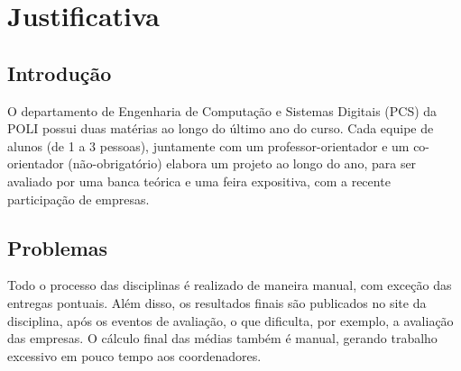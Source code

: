 \chapter{Justificativa}

\section{Introdução}
O departamento de Engenharia de Computação e Sistemas Digitais (PCS) da POLI possui duas matérias ao longo do último ano do curso. Cada equipe de alunos (de 1 a 3 pessoas), juntamente com um professor-orientador e um co-orientador (não-obrigatório) elabora um projeto ao longo do ano, para ser avaliado por uma banca teórica e uma feira expositiva, com a recente participação de empresas.

\section{Problemas}
Todo o processo das disciplinas é realizado de maneira manual, com exceção das entregas pontuais. Além disso, os resultados finais são publicados no site da disciplina, após os eventos de avaliação, o que dificulta, por exemplo, a avaliação das empresas. O cálculo final das médias também é manual, gerando trabalho excessivo em pouco tempo aos coordenadores.
